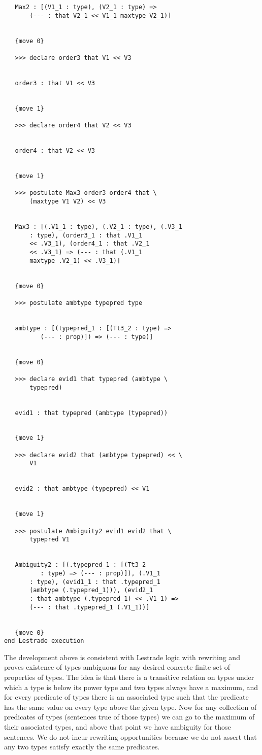 \documentclass[12pt]{article}
\begin{document}
\begin{verbatim}
   Max2 : [(V1_1 : type), (V2_1 : type) => 
       (--- : that V2_1 << V1_1 maxtype V2_1)]


   {move 0}

   >>> declare order3 that V1 << V3


   order3 : that V1 << V3


   {move 1}

   >>> declare order4 that V2 << V3


   order4 : that V2 << V3


   {move 1}

   >>> postulate Max3 order3 order4 that \
       (maxtype V1 V2) << V3


   Max3 : [(.V1_1 : type), (.V2_1 : type), (.V3_1 
       : type), (order3_1 : that .V1_1 
       << .V3_1), (order4_1 : that .V2_1 
       << .V3_1) => (--- : that (.V1_1 
       maxtype .V2_1) << .V3_1)]


   {move 0}

   >>> postulate ambtype typepred type


   ambtype : [(typepred_1 : [(Tt3_2 : type) => 
          (--- : prop)]) => (--- : type)]


   {move 0}

   >>> declare evid1 that typepred (ambtype \
       typepred)


   evid1 : that typepred (ambtype (typepred))


   {move 1}

   >>> declare evid2 that (ambtype typepred) << \
       V1


   evid2 : that ambtype (typepred) << V1


   {move 1}

   >>> postulate Ambiguity2 evid1 evid2 that \
       typepred V1


   Ambiguity2 : [(.typepred_1 : [(Tt3_2 
          : type) => (--- : prop)]), (.V1_1 
       : type), (evid1_1 : that .typepred_1 
       (ambtype (.typepred_1))), (evid2_1 
       : that ambtype (.typepred_1) << .V1_1) => 
       (--- : that .typepred_1 (.V1_1))]


   {move 0}
end Lestrade execution
\end{verbatim}

The development above is consistent with Lestrade logic with rewriting and proves existence of types ambiguous for any desired concrete finite set of properties of types.  The idea is that there is a transitive relation on types under which a type is below its power type and two types always have a maximum, 
and for every predicate of types there is an associated type such that the predicate has the same value on every type above the given type.  Now for any
collection of predicates of types (sentences true of those types) we can go to the maximum of their associated types, and above that point we have ambiguity for those sentences.  We do not incur rewriting opportunities because we do not assert that any two types satisfy exactly the same predicates.
\end{document}
